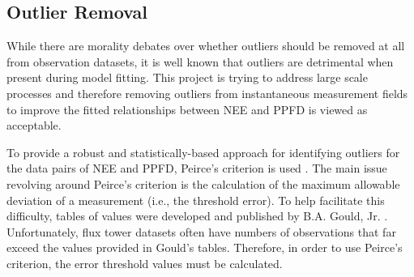 \subsection{Outlier Removal}
\label{sec:mst1out}
While there are morality debates over whether outliers should be removed at all from observation datasets, it is well known that outliers are detrimental when present during model fitting.  
This project is trying to address large scale processes and therefore removing outliers from instantaneous measurement fields to improve the fitted relationships between NEE and PPFD is viewed as acceptable.

To provide a robust and statistically-based approach for identifying outliers for the data pairs of NEE and PPFD, Peirce's criterion is used \parencite{peirce52}.  
The main issue revolving around Peirce's criterion is the calculation of the maximum allowable deviation of a measurement (i.e., the threshold error).  
To help facilitate this difficulty, tables of values were developed and published by B.A. Gould, Jr. \parencite{gould55}.  
Unfortunately, flux tower datasets often have numbers of observations that far exceed the values provided in Gould's tables. 
Therefore, in order to use Peirce's criterion, the error threshold values must be calculated.

